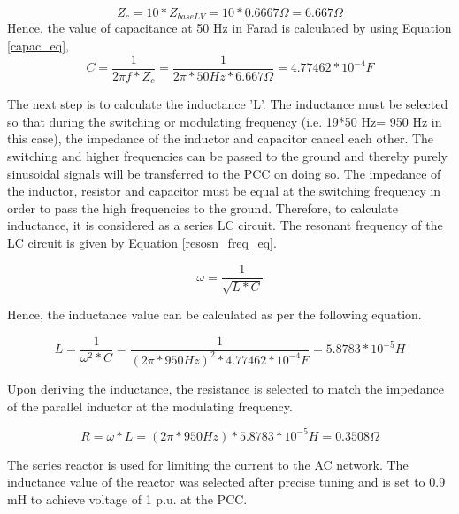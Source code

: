 \begin{equation}
    Z_c = 10 * Z_{baseLV} = 10 * 0.6667 \Omega = 6.667 \Omega   
\end{equation}
Hence, the value of capacitance at 50 Hz in Farad is calculated by using Equation \ref{capac_eq},
\begin{equation}\label{capac_eq}
    C = \frac{1}{2\pi f *Z_c} = \frac{1}{2\pi*50 Hz*6.667\Omega} = 4.77462*10^{-4} F
\end{equation}

The next step is to calculate the inductance 'L'. The inductance must be selected so that during the switching or modulating frequency (i.e. 19*50 Hz= 950 Hz in this case), the impedance of the inductor and capacitor cancel each other. The switching and higher frequencies can be passed to the ground and thereby purely sinusoidal signals will be transferred to the \gls{PCC} on doing so. The impedance of the inductor, resistor and capacitor must be equal at the switching frequency in order to pass the high frequencies to the ground. Therefore, to calculate inductance, it is considered as a series LC circuit. The resonant frequency of the LC circuit is given by Equation \ref{resosn_freq_eq}.

\begin{equation}\label{resosn_freq_eq}
    \omega = \frac{1}{\sqrt{L*C}}    
\end{equation}

Hence, the inductance value can be calculated as per the following equation.

\begin{equation}
    L = \frac{1}{\omega^2*C} = \frac{1}{(2\pi * 950 Hz)^2* 4.77462*10^{-4} F} = 5.8783*10^{-5} H
\end{equation}

Upon deriving the inductance, the resistance is selected to match the impedance of the parallel inductor at the modulating frequency.

\begin{equation}
    R = \omega* L = (2\pi*950 Hz)*5.8783*10^{-5} H = 0.3508 \Omega
\end{equation}

The series reactor is used for limiting the current to the \gls{AC} network. The inductance value of the reactor was selected after precise tuning and is set to 0.9 mH to achieve voltage of 1 p.u. at the \gls{PCC}.

